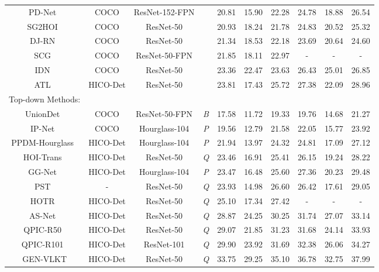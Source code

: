 \documentclass[10pt,twocolumn,letterpaper]{article}
\newcommand{\xmark}{\ding{55}}\newcommand{\cmark}{\ding{51}}
\begin{document}
\begin{table*}[!t]
\begin{center}
{\begin{tabular}{cccc|ccc|ccc}
  
  PD-Net~\cite{zhong2020polysemy}	&COCO	&ResNet-152-FPN	&\xmark			&20.81	&15.90	&22.28       &24.78	&18.88	&26.54\\ 
  SG2HOI~\cite{he2021exploiting}	&COCO	&ResNet-50		&\xmark				&20.93& 18.24 &21.78 &24.83 &20.52& 25.32\\
  DJ-RN~\cite{li2020detailed}		&COCO	&ResNet-50		&\xmark			&21.34	&18.53	&22.18       &23.69	&20.64	&24.60\\
  SCG~\cite{zhang2021spatially}		&COCO	&ResNet-50-FPN		&\xmark			&21.85 &18.11 &22.97      &-& -& - \\
  IDN~\cite{li2020hoi} &COCO &ResNet-50	&\xmark  & 23.36 &22.47 &23.63 &26.43 &25.01 &26.85\\
    ATL~\cite{hou2021affordance}	&HICO-Det	&ResNet-50	&\xmark			&23.81& 17.43 &25.72& 27.38 &22.09 &28.96\\
  \hline 
  Top-down Methods:      &  &               &       & & & &  & &\\
  UnionDet~\cite{Kim2020_unidet}	&COCO		&ResNet-50-FPN	&\emph{B}			&17.58	&11.72	&19.33       &19.76	&14.68	&21.27\\
  IP-Net~\cite{wang2020learning}	&COCO	&Hourglass-104	&\emph{P}				&19.56	&12.79	&21.58      	 &22.05	&15.77	&23.92\\
  PPDM-Hourglass~\cite{liao2020ppdm}	& HICO-Det	&Hourglass-104	&\emph{P}			&21.94	&13.97	&24.32       &24.81	&17.09	&27.12\\
  HOI-Trans~\cite{zou2021_hoitrans}	& HICO-Det	&ResNet-50	&\emph{Q}			&23.46& 16.91& 25.41       &26.15& 19.24& 28.22\\ 
  GG-Net~\cite{zhong2021glance}	&HICO-Det	&Hourglass-104	&\emph{P}		&23.47	&16.48&	25.60&	27.36&	20.23&	29.48\\PST~\cite{dong2021visual}	& -	&ResNet-50	&\emph{Q}			&23.93& 14.98& 26.60& 26.42 &17.61& 29.05\\ 
  HOTR~\cite{Kim_2021_CVPR}	& HICO-Det	&ResNet-50	&\emph{Q}			&25.10& 17.34 &27.42& - & - & -\\ 
  AS-Net~\cite{chen_2021_asnet}		& HICO-Det			&ResNet-50	&\emph{Q}			&28.87	&24.25	&30.25 &31.74	&27.07	&33.14  \\
  QPIC-R50~\cite{tamura2021qpic}		& HICO-Det		&ResNet-50	&\emph{Q}			&29.07	&21.85	&31.23 &31.68	&24.14	&33.93  \\
  QPIC-R101~\cite{tamura2021qpic}		& HICO-Det		&ResNet-101	&\emph{Q}			&29.90	&23.92	&31.69 &32.38	&26.06	&34.27  \\
  \cellcolor{mygray-bg}GEN-VLKT		& \cellcolor{mygray-bg}HICO-Det		&\cellcolor{mygray-bg}ResNet-50	&\cellcolor{mygray-bg}\emph{Q}				&\cellcolor{mygray-bg}33.75	&\cellcolor{mygray-bg}29.25	&\cellcolor{mygray-bg}35.10      &\cellcolor{mygray-bg}36.78	&\cellcolor{mygray-bg}32.75	&\cellcolor{mygray-bg}37.99 \\

\end{tabular}}
\end{center}
\end{table*}
\end{document}
